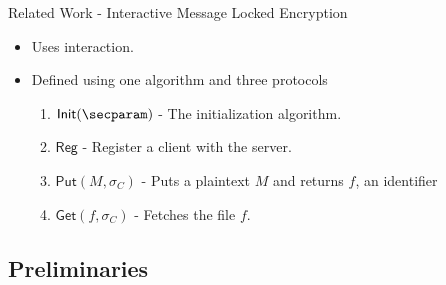 \documentclass{beamer}
\newcommand{\client}{\sigma_C}
\begin{document}
\begin{frame}{Related Work - Interactive Message Locked Encryption}
	\begin{itemize}
		\setlength\itemsep{1em}
		\item Uses interaction.
		\item Defined using one algorithm and three protocols
		\begin{enumerate}
		    \item $\mathsf{Init}(\secparam)$ - The initialization algorithm.
		    \item $\mathsf{Reg}$ - Register a client with the server.
		    \item $\mathsf{Put}(M, \client)$ - Puts a plaintext $M$ and returns $f$, an identifier
		    \item $\mathsf{Get}(f, \client)$ - Fetches the file $f$.
		\end{enumerate}
	\end{itemize}
\end{frame}

\subsection{Preliminaries}
\end{document}
